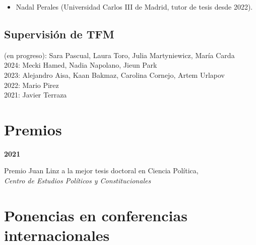 \documentclass[a4paper, 12pt]{article}
\begin{document}
{\begin{itemize}[leftmargin=*, nolistsep]
	\item Nadal Perales (Universidad Carlos III de Madrid, tutor de tesis desde 2022).
\end{itemize}

\subsection*{Supervisión de TFM}

 (en progreso): Sara Pascual, Laura Toro, Julia Martyniewicz, María Carda\\
2024: Mecki Hamed, Nadia Napolano, Jieun Park\\
2023: Alejandro Aisa, Kaan Bakmaz, Carolina Cornejo, Artem Urlapov\\
2022: Mario Pirez\\
2021: Javier Terraza

\section*{Premios}


\noindent
\begin{minipage}[t]{0.1\textwidth}
\textbf{2021}
\end{minipage}\hfill\begin{minipage}[t]{0.9\textwidth}
Premio Juan Linz a la mejor tesis doctoral en Ciencia Política,\\\textit{Centro de Estudios Políticos y Constitucionales}\\\vspace{-8pt}
\end{minipage}


\section*{Ponencias en conferencias internacionales}

}
\end{document}
